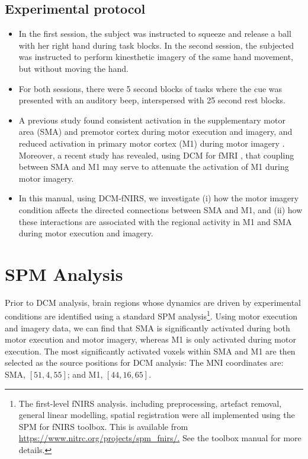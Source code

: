 \subsection*{Experimental protocol}
\begin{itemize}
\item In the first session, the subject was instructed to squeeze and release a ball with her right hand during task blocks. In the second session, the subjected was instructed to perform kinesthetic imagery of the same hand movement, but without moving the hand. 
\item For both sessions, there were 5 second blocks of tasks where the cue was presented with an auditory beep, interspersed with 25 second rest blocks. 
\item A previous study found consistent activation in the supplementary motor area (SMA) and premotor cortex during motor execution and imagery, and reduced activation in primary motor cortex (M1) during motor imagery \cite{hanakawa2003functional}. Moreover, a recent study has revealed, using DCM for fMRI \cite{kasess2008suppressive}, that coupling between SMA and M1 may serve to attenuate the activation of M1 during motor imagery. 
\item In this manual, using DCM-fNIRS, we investigate (i) how the motor imagery condition affects the directed connections between SMA and M1, and (ii) how these interactions are associated with the regional activity in M1 and SMA during motor execution and imagery.
\end{itemize}

\section{SPM Analysis}
Prior to DCM analysis, brain regions whose dynamics are driven by experimental conditions are identified using a standard SPM analysis\footnote{The first-level fNIRS analysis. including preprocessing, artefact removal, general linear modelling, spatial registration were all implemented using the SPM for fNIRS toolbox. This is available from \url{https://www.nitrc.org/projects/spm_fnirs/.} See the toolbox manual for more details.}. Using motor execution and imagery data, we can find that SMA is significantly activated during both motor execution and motor imagery, whereas M1 is only activated during motor execution. The most significantly activated voxels within SMA and M1 are then selected as the source positions for DCM analysis: The MNI coordinates are: SMA, $[51, 4, 55]$; and M1, $[44, 16, 65]$.

